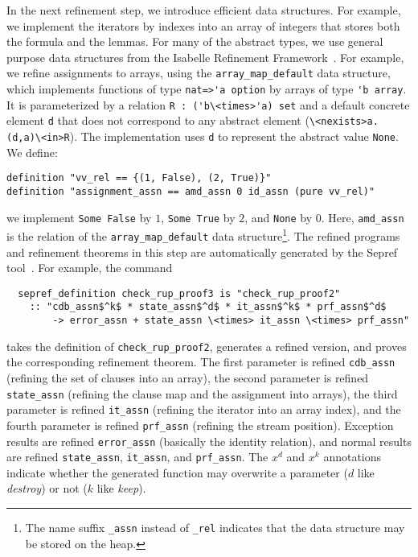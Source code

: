 \documentclass{llncs}
\newcommand{\isai}{\lstinline[language=isabelle,basicstyle=\normalsize\ttfamily\slshape]}
\begin{document}
In the next refinement step, we introduce efficient data structures. For example, we implement the iterators by indexes 
into an array of integers that stores both the formula and the lemmas.
For many of the abstract types, we use general purpose data structures from the Isabelle Refinement Framework~\cite{La15,La16}.
For example, we refine assignments to arrays, using the \isai{array_map_default} data structure, which implements functions of type \isai{nat=>'a option} by
arrays of type \isai$'b array$. It is parameterized by a relation \isai$R : ('b\<times>'a) set$ and a default concrete element \isai$d$ that does not correspond to 
any abstract element (\isai$\<nexists>a. (d,a)\<in>R$). The implementation uses \isai$d$ to represent the abstract value \isai$None$.
We define:
\begin{lstlisting}
definition "vv_rel == {(1, False), (2, True)}"
definition "assignment_assn == amd_assn 0 id_assn (pure vv_rel)"
\end{lstlisting}
\ie we implement \isai{Some False} by $1$, \isai{Some True} by $2$, and \isai$None$ by $0$.
Here, \isai$amd_assn$ is the relation of the \isai$array_map_default$ data structure\footnote{The name suffix \isai$_assn$ instead of \isai$_rel$ 
indicates that the data structure may be stored on the heap.}.
The refined programs and refinement theorems in this step are automatically generated by the Sepref tool~\cite{La15}. For example, the command
\begin{lstlisting}
  sepref_definition check_rup_proof3 is "check_rup_proof2"
    :: "cdb_assn$^k$ * state_assn$^d$ * it_assn$^k$ * prf_assn$^d$ 
        -> error_assn + state_assn \<times> it_assn \<times> prf_assn"
\end{lstlisting}
takes the definition of \isai{check_rup_proof2}, generates a refined version, and proves the corresponding refinement theorem.
The first parameter is refined \wrt \isai{cdb_assn} (refining the set of clauses into an array), 
the second parameter is refined \wrt \isai{state_assn} (refining the clause map and the assignment into arrays), the third parameter is refined 
\wrt \isai{it_assn} (refining the iterator into an array index), and the fourth parameter is refined \wrt \isai{prf_assn} (refining the stream position). 
Exception results are refined \wrt \isai{error_assn} (basically the identity relation), and normal results are refined \wrt \isai{state_assn}, \isai{it_assn}, and \isai{prf_assn}.
The $x^d$ and $x^k$ annotations indicate whether the generated function may overwrite a parameter ($d$ like {\em destroy}) or not ($k$ like {\em keep}). 
\end{document}
